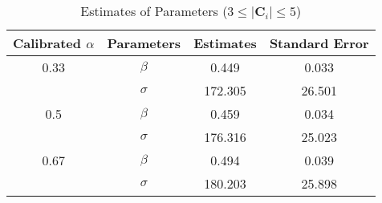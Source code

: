 \begin{table}[H]
\centering
\caption{Estimates of Parameters ($3 \leq |\mathbf{C}_i| \leq 5$)}
\label{table: estimates (min_size=3 max_size=5 margin=2000)}
\begin{tabular}{cccc}
\toprule
Calibrated $\alpha$ & Parameters & Estimates & Standard Error \\
\midrule
0.33 & $\beta$ & 0.449 & 0.033 \\
 & $\sigma$ & 172.305 & 26.501 \\
0.5 & $\beta$ & 0.459 & 0.034 \\
 & $\sigma$ & 176.316 & 25.023 \\
0.67 & $\beta$ & 0.494 & 0.039 \\
 & $\sigma$ & 180.203 & 25.898 \\
\bottomrule
\end{tabular}
\end{table}
